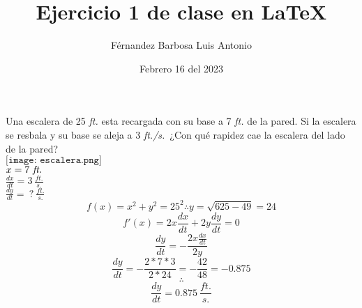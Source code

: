 \documentclass[10pt,a4paper]{article}
\title {Ejercicio 1 de clase en LaTeX}
\author{F\'ernandez Barbosa Luis Antonio}
\date{Febrero 16 del 2023}
\begin{document}
	\maketitle
	Una escalera de 25 \emph{ft.} esta recargada con su base a 7 \emph{ft.} de la pared. Si la escalera se resbala y su base se aleja a 3 \emph{ft./s.}\ ¿Con qu\'e rapidez cae la escalera del lado de la pared?
	$$$$
	$\texttt{[image: escalera.png]}$
	$$$$
	$x=7\ \emph{ft.}$
	$$$$
	$\frac{dx}{dt}=3\ \frac{ft.}{s.}$ 
	$$$$
	$\frac{dy}{dt}=\ ?\ \frac{ft.}{s.}$
	$$$$
	$$f(x)=x^2 + y^2 = 25^2 \therefore y=\sqrt{625-49}=24$$
	$$f'(x)=2x\frac{dx}{dt}+2y\frac{dy}{dt}=0$$
	$$\frac{dy}{dt}=-\frac{2x\frac{dx}{dt}}{2y}$$
	$$\frac{dy}{dt}=-\frac{2*7*3}{2*24}=-\frac{42}{48}=-0.875$$
	$$\therefore$$
	$$\frac{dy}{dt}=0.875\ \frac{ft.}{s.}$$
	
\end{document}
